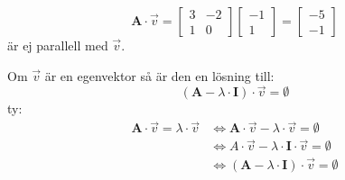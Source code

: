 \begin{Ex}
	\[
	\mathbf{A} \cdot \vec{v} = \begin{bmatrix} 3&-2\\1&0 \end{bmatrix}\begin{bmatrix} -1\\1 \end{bmatrix} = \begin{bmatrix} -5\\-1 \end{bmatrix}
	\]
	är ej parallell med $\vec{v}$.\\
\end{Ex}
\newpage
\noindent
Om $\vec{v}$ är en egenvektor så är den en lösning till:
\[
(\mathbf{A} - \lambda \cdot \mathbf{I}) \cdot \vec{v} = \emptyset
\]
ty:
\begin{align*}
\mathbf{A} \cdot \vec{v} = \lambda \cdot \vec{v} &\Leftrightarrow \mathbf{A} \cdot \vec{v} - \lambda \cdot \vec{v} = \emptyset\\
&\Leftrightarrow A \cdot \vec{v} - \lambda \cdot \mathbf{I} \cdot \vec{v} = \emptyset\\
&\Leftrightarrow(\mathbf{A} - \lambda \cdot \mathbf{I}) \cdot \vec{v} = \emptyset
\end{align*}


